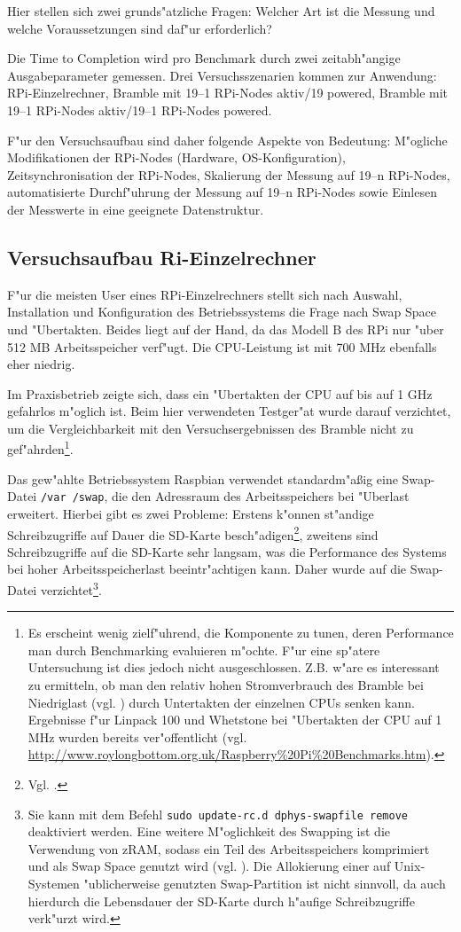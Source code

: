 Hier stellen sich zwei grunds"atzliche Fragen: Welcher Art ist die Messung und welche Voraussetzungen sind daf"ur erforderlich? 

Die Time to Completion wird pro Benchmark durch zwei zeitabh"angige Ausgabeparameter gemessen. Drei Versuchsszenarien kommen zur Anwendung: RPi-Einzelrechner, Bramble mit 19--1 RPi-Nodes aktiv/19 powered, Bramble mit 19--1 RPi-Nodes aktiv/19--1 RPi-Nodes powered. 

F"ur den Versuchsaufbau sind daher folgende Aspekte von Bedeutung: M"ogliche Modifikationen der RPi-Nodes (Hardware, OS-Konfiguration), Zeitsynchronisation der RPi-Nodes, Skalierung der Messung auf 19--n RPi-Nodes, automatisierte Durchf"uhrung der Messung auf 19--n RPi-Nodes sowie Einlesen der Messwerte in eine geeignete Datenstruktur. 

\subsection{Versuchsaufbau Ri-Einzelrechner}\label{RPi-Versuchsaufbau}

F"ur die meisten User eines RPi-Einzelrechners stellt sich nach Auswahl, Installation und Konfiguration des Betriebssystems die Frage nach Swap Space und "Ubertakten. Beides liegt auf der Hand, da das Modell B des RPi nur "uber 512 MB Arbeitsspeicher verf"ugt. Die CPU-Leistung ist mit 700 MHz ebenfalls eher niedrig. 

Im Praxisbetrieb zeigte sich, dass ein "Ubertakten der CPU auf bis auf 1 GHz gefahrlos m"oglich ist. Beim hier verwendeten Testger"at wurde darauf verzichtet, um die Vergleichbarkeit mit den Versuchsergebnissen des Bramble nicht zu gef"ahrden\footnote{Es erscheint wenig zielf"uhrend, die Komponente zu tunen, deren Performance man durch Benchmarking evaluieren m"ochte. F"ur eine sp"atere Untersuchung ist dies jedoch nicht ausgeschlossen. Z.B. w"are es interessant zu ermitteln, ob man den relativ hohen Stromverbrauch des Bramble bei Niedriglast (vgl. \cite{kli13}) durch Untertakten der einzelnen CPUs senken kann. Ergebnisse f"ur Linpack 100 und Whetstone bei "Ubertakten der CPU auf 1 MHz wurden bereits ver"offentlicht (vgl. \url{http://www.roylongbottom.org.uk/Raspberry\%20Pi\%20Benchmarks.htm}).}.

Das gew"ahlte Betriebssystem Raspbian verwendet standardm"a\ss ig eine Swap-Datei \texttt{/var /swap}, die den Adressraum des Arbeitsspeichers bei "Uberlast erweitert. Hierbei gibt es zwei Probleme: Erstens k"onnen st"andige Schreibzugriffe auf Dauer die SD-Karte besch"adigen\footnote{Vgl. \cite{pow12}.}, zweitens sind Schreibzugriffe auf die SD-Karte sehr langsam, was die Performance des Systems bei hoher Arbeitsspeicherlast beeintr"achtigen kann. Daher wurde auf die Swap-Datei verzichtet\footnote{Sie kann mit dem Befehl \texttt{sudo update-rc.d dphys-swapfile remove} deaktiviert werden. Eine weitere M"oglichkeit des Swapping ist die Verwendung von zRAM, sodass ein Teil des Arbeitsspeichers komprimiert und als Swap Space genutzt wird (vgl. \cite{pow12}). Die Allokierung einer auf Unix-Systemen "ublicherweise genutzten Swap-Partition ist nicht sinnvoll, da auch hierdurch die Lebensdauer der SD-Karte durch h"aufige Schreibzugriffe verk"urzt wird.}. 

